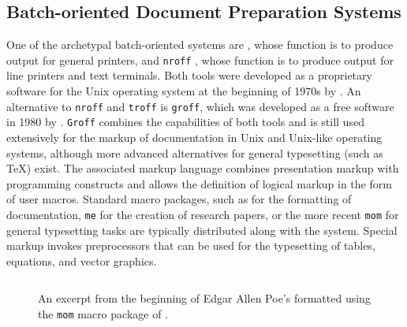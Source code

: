 \documentclass{book}
\begin{document}
\subsection{Batch-oriented Document Preparation Systems}
One of the archetypal batch-oriented systems are , whose
function is to produce output for general printers, and \texttt{nroff}%
, whose function is to produce
output for line printers and text terminals. Both tools were developed as a
proprietary software for the Unix operating system at the beginning of 1970s by
. An alternative to \texttt{nroff} and \texttt{troff} is
\texttt{groff}, which was
developed as a free software in 1980 by . \texttt{Groff} combines
the capabilities of both tools and is still used extensively for the markup of
documentation in Unix and Unix-like operating systems, although more advanced
alternatives for general typesetting (such as \TeX) exist. The associated markup
language combines presentation markup with programming constructs and allows the
definition of logical markup in the form of user macros. Standard macro
packages, such as  for the formatting of documentation,
\texttt{me}  for the creation of research
papers, or the more recent \texttt{mom}  for
general typesetting tasks are typically distributed along with the system.
Special markup invokes preprocessors that can be used for the typesetting of
tables, equations, and vector graphics.

\begin{figure}
  \inputminted{groff}{examples/02/poe.groff}
  \caption{An excerpt from the beginning of Edgar Allen Poe's  formatted using the \texttt{mom}
     macro package of .}
  \label{fig:poe}
\end{figure}

\end{document}
